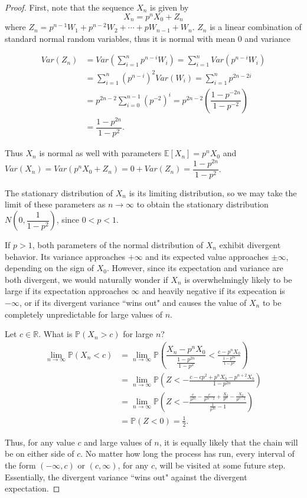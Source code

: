 \documentclass[12pt]{article}
\newcommand{\p}{\mathbb{P}}
\newcommand{\E}{\mathbb{E}}
\theoremstyle{definition}
\begin{document}
\begin{proof}

First, note that the sequence $X_n$ is given by $$X_n = p^nX_0 + Z_n$$ where $Z_n = p^{n-1}W_1 + p^{n-2}W_2 + \cdots + pW_{n-1} + W_n$.  $Z_n$ is a linear combination of standard normal random variables, thus it is normal with mean $0$ and variance

\begin{align*}
Var(Z_n) &= Var \left( \sum\limits_{i=1}^n p^{n-i}W_i \right) = \sum\limits_{i=1}^n Var \left(p^{n-i}W_i \right) \\
&= \sum\limits_{i=1}^n (p^{n-i})^2 Var(W_i) = \sum\limits_{i=1}^n p^{2n-2i} \\
&= p^{2n-2}\sum\limits_{i=0}^{n-1} (p^{-2})^i
= p^{2n-2} \left( \dfrac{1-p^{-2n}}{1-p^{-2}} \right) \\
&= \dfrac{1-p^{2n}}{1-p^2}.
\end{align*}

\noindent Thus $X_n$ is normal as well with parameters $\E[X_n] = p^nX_0$ and $Var(X_n) = Var(p^nX_0 + Z_n) = 0 + Var(Z_n) = \dfrac{1-p^{2n}}{1-p^2}$.

The stationary distribution of $X_n$ is its limiting distribution, so we may take the limit of these parameters as $n \rightarrow \infty$ to obtain the stationary distribution $N \left(0, \dfrac{1}{1-p^2} \right)$, since $0 < p < 1$.

If $p>1$, both parameters of the normal distribution of $X_n$ exhibit divergent behavior.  Its variance approaches $+ \infty$ and its expected value approaches $\pm \infty$, depending on the sign of $X_0$.  However, since its expectation and variance are both divergent, we would naturally wonder if $X_n$ is overwhelmingly likely to be large if its expectation approaches $\infty$ and heavily negative if its expecation is $-\infty$, or if its divergent variance ``wins out" and causes the value of $X_n$ to be completely unpredictable for large values of $n$.

Let $c \in \mathbb{R}$.  What is $\p(X_n > c)$ for large $n$?
\begin{align*}
\lim_{n \rightarrow \infty} \p(X_n < c) &=
\lim_{n \rightarrow \infty} \p\left(\dfrac{X_n - p^nX_0}{\frac{1-p^{2n}}{1-p^2}} < \frac{c - p^n X_0}{\frac{1-p^{2n}}{1-p^2}} \right) \\
&= \lim_{n \rightarrow \infty} \p \left( Z < - \frac{c - cp^2 + p^nX_0 - p^{n+2} X_0}{1-p^{2n}} \right) \\
&= \lim_{n \rightarrow \infty} \p \left( Z < -\frac{\frac{c}{p^{2n}} - \frac{c}{p^{2n-2}} + \frac{X_0}{p^n} - \frac{X_0}{p^{n-2}} }{\frac{1}{p^{2n}} - 1} \right) \\
&= \p \left( Z < 0 \right) = \frac12.
\end{align*}

Thus, for any value $c$ and large values of $n$, it is equally likely that the chain will be on either side of $c$.  No matter how long the process has run, every interval of the form $(-\infty,c)$ or $(c,\infty)$, for any $c$, will be visited at some future step.  Essentially, the divergent variance ``wins out" against the divergent expectation.

\end{proof}
\end{document}
